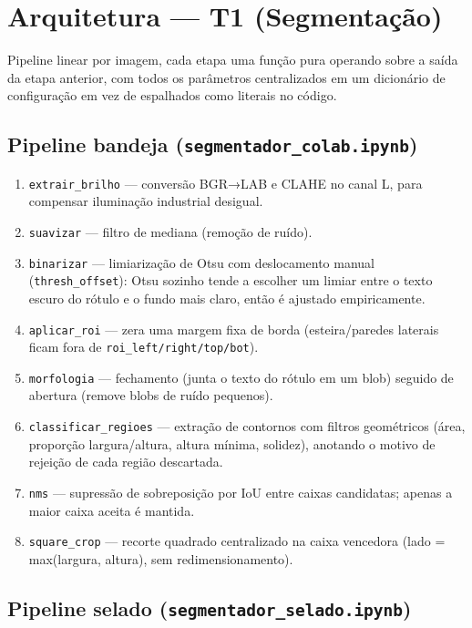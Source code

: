 \documentclass[a4paper,11pt]{article}
\begin{document}
\section{Arquitetura --- T1 (Segmentação)}

Pipeline linear por imagem, cada etapa uma função pura operando sobre a saída da etapa anterior,
com todos os parâmetros centralizados em um dicionário de configuração em vez de espalhados como
literais no código.

\subsection{Pipeline bandeja (\texttt{segmentador\_colab.ipynb})}

\begin{enumerate}[nosep]
  \item \texttt{extrair\_brilho} --- conversão BGR→LAB e CLAHE no canal L, para compensar
        iluminação industrial desigual.
  \item \texttt{suavizar} --- filtro de mediana (remoção de ruído).
  \item \texttt{binarizar} --- limiarização de Otsu com deslocamento manual
        (\texttt{thresh\_offset}): Otsu sozinho tende a escolher um limiar entre o texto escuro
        do rótulo e o fundo mais claro, então é ajustado empiricamente.
  \item \texttt{aplicar\_roi} --- zera uma margem fixa de borda (esteira/paredes laterais ficam
        fora de \texttt{roi\_left/right/top/bot}).
  \item \texttt{morfologia} --- fechamento (junta o texto do rótulo em um blob) seguido de
        abertura (remove blobs de ruído pequenos).
  \item \texttt{classificar\_regioes} --- extração de contornos com filtros geométricos (área,
        proporção largura/altura, altura mínima, solidez), anotando o motivo de rejeição de
        cada região descartada.
  \item \texttt{nms} --- supressão de sobreposição por IoU entre caixas candidatas; apenas a
        maior caixa aceita é mantida.
  \item \texttt{square\_crop} --- recorte quadrado centralizado na caixa vencedora (lado =
        max(largura, altura), sem redimensionamento).
\end{enumerate}

\subsection{Pipeline selado (\texttt{segmentador\_selado.ipynb})}
\end{document}
